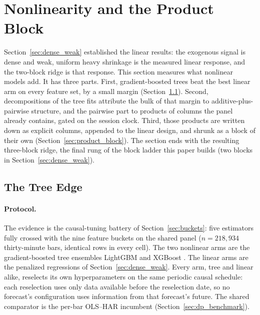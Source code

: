 \section{Nonlinearity and the Product Block}
\label{sec:nonlinear_product}


Section~\ref{sec:dense_weak} established the linear results: the exogenous
signal is dense and weak, uniform heavy shrinkage is the measured linear
response, and the two-block ridge is that response. This section measures
what nonlinear models add. It has three parts. First, gradient-boosted trees
beat the best linear arm on every feature set, by a small margin
(Section~\ref{sec:tree_edge}). Second, decompositions of the tree fits
attribute the bulk of that margin to additive-plus-pairwise structure, and
the pairwise part to products of columns the panel already contains, gated
on the session clock. Third, those products are written down as explicit
columns, appended to the linear design, and shrunk as a block of their own
(Section~\ref{sec:product_block}). The section ends with the resulting
three-block ridge, the final rung of the block ladder this paper builds
(two blocks in Section~\ref{sec:dense_weak}).

\subsection{The Tree Edge}
\label{sec:tree_edge}

\paragraph{Protocol.} The evidence is the causal-tuning battery of
Section~\ref{sec:buckets}: five estimators fully crossed with the nine
feature buckets on the shared panel ($n = 218{,}934$ thirty-minute bars,
identical rows in every cell). The two nonlinear arms are the
gradient-boosted tree ensembles LightGBM \citep{Ke2017} and XGBoost
\citep{Chen2016}. The linear arms are the penalized regressions of
Section~\ref{sec:dense_weak}. Every arm, tree and linear alike, reselects
its own hyperparameters on the same periodic causal schedule: each
reselection uses only data available before the reselection date, so no
forecast's configuration uses information from that forecast's future. The
shared comparator is the per-bar OLS--HAR incumbent
(Section~\ref{sec:dp_benchmark}).

